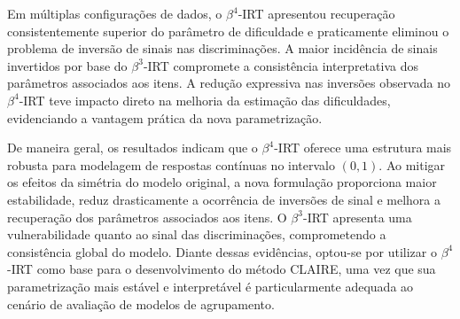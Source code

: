 Em múltiplas configurações de dados, o $\beta^{4}$-\gls{IRT} apresentou recuperação consistentemente superior do parâmetro de dificuldade e praticamente eliminou o problema de inversão de sinais nas discriminações. A  maior incidência de sinais invertidos por base do $\beta^{3}$-\gls{IRT} compromete a consistência interpretativa dos parâmetros associados aos itens. A redução expressiva nas inversões observada no $\beta^{4}$-\gls{IRT} teve impacto direto na melhoria da estimação das dificuldades, evidenciando a vantagem prática da nova parametrização.

De maneira geral, os resultados indicam que o $\beta^{4}$-\gls{IRT} oferece uma estrutura mais robusta para modelagem de respostas contínuas no intervalo $(0,1)$. Ao mitigar os efeitos da simétria do modelo original, a nova formulação proporciona maior estabilidade, reduz drasticamente a ocorrência de inversões de sinal e melhora a recuperação dos parâmetros associados aos itens. O $\beta^{3}$-\gls{IRT} apresenta uma vulnerabilidade quanto ao sinal das discriminações, comprometendo a consistência global do modelo. Diante dessas evidências, optou-se por utilizar o $\beta^{4}$-\gls{IRT} como base para o desenvolvimento do método \gls{CLAIRE}, uma vez que sua parametrização mais estável e interpretável é particularmente adequada ao cenário de avaliação de modelos de agrupamento.

